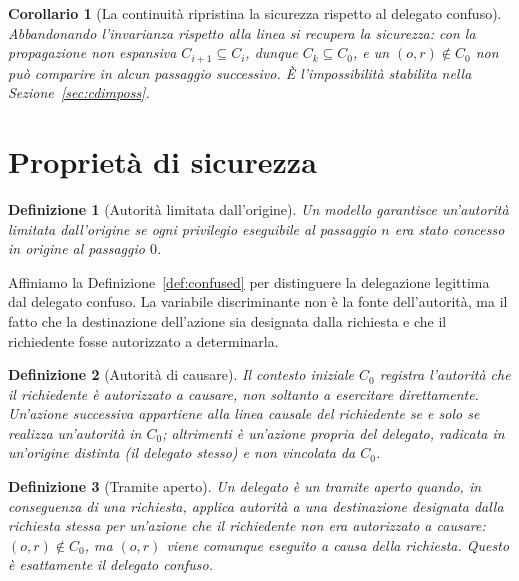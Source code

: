 \documentclass[11pt]{article}
\newtheorem{definition}{Definizione}
\newtheorem{corollary}{Corollario}
\begin{document}
\begin{corollary}[La continuità ripristina la sicurezza rispetto al delegato
confuso]
Abbandonando l'invarianza rispetto alla linea si recupera la sicurezza: con la
propagazione non espansiva $C_{i+1} \subseteq C_i$, dunque $C_k \subseteq C_0$,
e un $(o,r) \notin C_0$ non può comparire in alcun passaggio successivo. È
l'impossibilità stabilita nella Sezione~\ref{sec:cdimposs}.
\end{corollary}

\section{Proprietà di sicurezza}
\label{sec:openpassthrough}

\begin{definition}[Autorità limitata dall'origine]
Un modello garantisce un'autorità limitata dall'origine se ogni privilegio
eseguibile al passaggio $n$ era stato concesso in origine al passaggio $0$.
\end{definition}

Affiniamo la Definizione~\ref{def:confused} per distinguere la delegazione
legittima dal delegato confuso. La variabile discriminante non è la fonte
dell'autorità, ma il fatto che la destinazione dell'azione sia designata dalla
richiesta e che il richiedente fosse autorizzato a determinarla.

\begin{definition}[Autorità di causare]
Il contesto iniziale $C_0$ registra l'autorità che il richiedente è autorizzato
a \emph{causare}, non soltanto a esercitare direttamente. Un'azione successiva
appartiene alla linea causale del richiedente se e solo se realizza un'autorità
in $C_0$; altrimenti è un'azione propria del delegato, radicata in un'origine
distinta (il delegato stesso) e non vincolata da $C_0$.
\end{definition}

\begin{definition}[Tramite aperto]
Un delegato è un \emph{tramite aperto} quando, in conseguenza di una richiesta,
applica autorità a una destinazione designata dalla richiesta stessa per
un'azione che il richiedente non era autorizzato a causare:
$(o,r) \notin C_0$, ma $(o,r)$ viene comunque eseguito a causa della richiesta.
Questo è esattamente il delegato confuso.
\end{definition}
\end{document}
